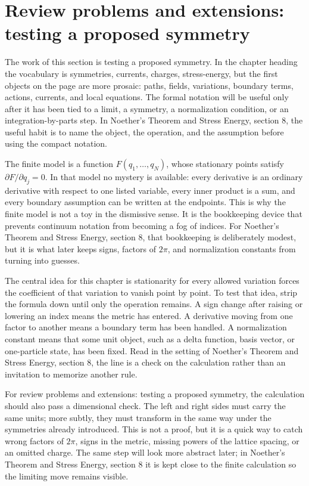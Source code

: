 \section{Review problems and extensions: testing a proposed symmetry}

The work of this section is testing a proposed symmetry.  In the chapter heading the vocabulary is symmetries, currents, charges, stress-energy, but the first objects on the page are more prosaic: paths, fields, variations, boundary terms, actions, currents, and local equations.  The formal notation will be useful only after it has been tied to a limit, a symmetry, a normalization condition, or an integration-by-parts step.  In Noether's Theorem and Stress Energy, section 8, the useful habit is to name the object, the operation, and the assumption before using the compact notation.

The finite model is a function \(F(q_1,\ldots,q_N)\), whose stationary points satisfy \( \partial F/\partial q_j=0 \).  In that model no mystery is available: every derivative is an ordinary derivative with respect to one listed variable, every inner product is a sum, and every boundary assumption can be written at the endpoints.  This is why the finite model is not a toy in the dismissive sense.  It is the bookkeeping device that prevents continuum notation from becoming a fog of indices.  For Noether's Theorem and Stress Energy, section 8, that bookkeeping is deliberately modest, but it is what later keeps signs, factors of \(2\pi\), and normalization constants from turning into guesses.

The central idea for this chapter is stationarity for every allowed variation forces the coefficient of that variation to vanish point by point.  To test that idea, strip the formula down until only the operation remains.  A sign change after raising or lowering an index means the metric has entered.  A derivative moving from one factor to another means a boundary term has been handled.  A normalization constant means that some unit object, such as a delta function, basis vector, or one-particle state, has been fixed.  Read in the setting of Noether's Theorem and Stress Energy, section 8, the line is a check on the calculation rather than an invitation to memorize another rule.

For review problems and extensions: testing a proposed symmetry, the calculation should also pass a dimensional check.  The left and right sides must carry the same units; more subtly, they must transform in the same way under the symmetries already introduced.  This is not a proof, but it is a quick way to catch wrong factors of \(2\pi\), signs in the metric, missing powers of the lattice spacing, or an omitted charge.  The same step will look more abstract later; in Noether's Theorem and Stress Energy, section 8 it is kept close to the finite calculation so the limiting move remains visible.

